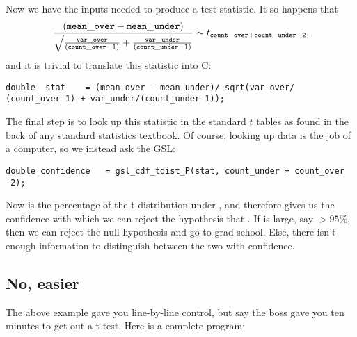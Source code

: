 Now we have the inputs needed to produce a test statistic. It so happens
that 
$$
\frac{({\tt mean\_over - mean\_under})}
{\sqrt{\frac{{\tt var\_over}}{({\tt count\_over}-1)}+ \frac{{\tt var\_under}}{({\tt count\_under}-1)}}} \sim t_{\tt count\_over + count\_under - 2},
$$
and it is trivial to translate this statistic into C: 
\begin{lstlisting}
double	stat    = (mean_over - mean_under)/ sqrt(var_over/ (count_over-1) + var_under/(count_under-1));
\end{lstlisting}

The final step is to look up this statistic in the standard $t$ tables
as found in the back of any standard statistics textbook. Of course,
looking up data is the job of a computer, so we instead ask the GSL:
\begin{lstlisting}
double confidence   = gsl_cdf_tdist_P(stat, count_under + count_over -2);
\end{lstlisting}
Now  is the percentage of the t-distribution under
, and therefore gives us the confidence with which we can
reject the hypothesis that . If
 is large, say $> 95\%$, then we can reject the null
hypothesis and go to grad school. Else, there isn't enough information
to distinguish between the two with confidence.

\subsection{No, easier} The above example gave you line-by-line
control, but say the boss gave you ten minutes to get out a
t-test. Here is a complete program:

